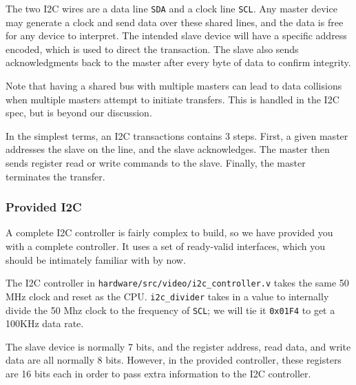 \documentclass[11pt]{article}
\begin{document}
The two I2C wires are a data line \verb|SDA| and a clock line \verb|SCL|. Any master device may generate a clock and send data over these shared lines, and the data is free for any device to interpret. The intended slave device will have a specific address encoded, which is used to direct the transaction. The slave also sends acknowledgments back to the master after every byte of data to confirm integrity.

Note that having a shared bus with multiple masters can lead to data collisions when multiple masters attempt to initiate transfers. This is handled in the I2C spec, but is beyond our discussion.

In the simplest terms, an I2C transactions contains 3 steps. First, a given master addresses the slave on the line, and the slave acknowledges. The master then sends register read or write commands to the slave. Finally, the master terminates the transfer.

\subsubsection{Provided I2C}
A complete I2C controller is fairly complex to build, so we have provided you with a complete controller. It uses a set of ready-valid interfaces, which you should be intimately familiar with by now. 

The I2C controller in \verb|hardware/src/video/i2c_controller.v| takes the same 50 MHz clock and reset as the CPU. \verb|i2c_divider| takes in a value to internally divide the 50 Mhz clock to the frequency of \verb|SCL|; we will tie it \verb|0x01F4| to get a 100KHz data rate.

The slave device is normally 7 bits, and the register address, read data, and write data are all normally 8 bits. However, in the provided controller, these registers are 16 bits each in order to pass extra information to the I2C controller. 
\end{document}
